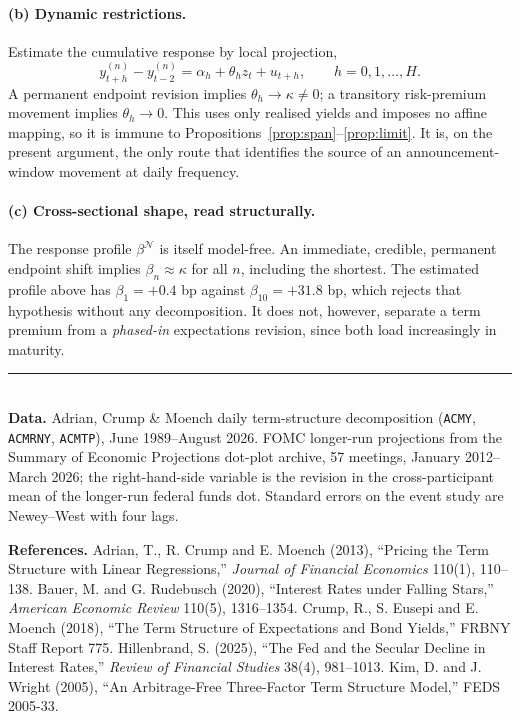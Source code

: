 \documentclass[11pt]{article}
\theoremstyle{remark}\newtheorem{remark}{Remark}
\begin{document}
\paragraph{(b) Dynamic restrictions.} Estimate the cumulative response by local projection,
\begin{equation}
y^{(n)}_{t+h}-y^{(n)}_{t-2}=\alpha_h+\theta_h z_t+u_{t+h},\qquad h=0,1,\dots,H .
\end{equation}
A permanent endpoint revision implies $\theta_h\to\kappa\neq0$; a transitory risk-premium movement implies $\theta_h\to0$. This uses only realised yields and imposes no affine mapping, so it is immune to Propositions~\ref{prop:span}--\ref{prop:limit}. It is, on the present argument, the only route that identifies the source of an announcement-window movement at daily frequency.

\paragraph{(c) Cross-sectional shape, read structurally.} The response profile $\beta^{\mathcal N}$ is itself model-free. An immediate, credible, permanent endpoint shift implies $\beta_n\approx\kappa$ for all $n$, including the shortest. The estimated profile above has $\beta_1=+0.4$ bp against $\beta_{10}=+31.8$ bp, which rejects that hypothesis without any decomposition. It does not, however, separate a term premium from a \emph{phased-in} expectations revision, since both load increasingly in maturity.

\vspace{1em}
\noindent\rule{\textwidth}{0.4pt}\\[0.4em]
\footnotesize
\textbf{Data.} Adrian, Crump \& Moench daily term-structure decomposition (\texttt{ACMY}, \texttt{ACMRNY}, \texttt{ACMTP}), June 1989--August 2026. FOMC longer-run projections from the Summary of Economic Projections dot-plot archive, 57 meetings, January 2012--March 2026; the right-hand-side variable is the revision in the cross-participant mean of the longer-run federal funds dot. Standard errors on the event study are Newey--West with four lags.

\vspace{0.6em}
\noindent\textbf{References.} Adrian, T., R. Crump and E. Moench (2013), ``Pricing the Term Structure with Linear Regressions,'' \emph{Journal of Financial Economics} 110(1), 110--138. \; Bauer, M. and G. Rudebusch (2020), ``Interest Rates under Falling Stars,'' \emph{American Economic Review} 110(5), 1316--1354. \; Crump, R., S. Eusepi and E. Moench (2018), ``The Term Structure of Expectations and Bond Yields,'' FRBNY Staff Report 775. \; Hillenbrand, S. (2025), ``The Fed and the Secular Decline in Interest Rates,'' \emph{Review of Financial Studies} 38(4), 981--1013. \; Kim, D. and J. Wright (2005), ``An Arbitrage-Free Three-Factor Term Structure Model,'' FEDS 2005-33.
\end{document}
